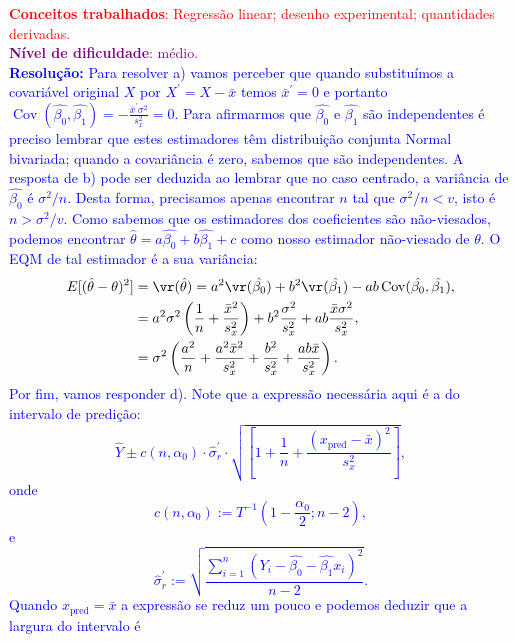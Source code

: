 \textcolor{red}{\textbf{Conceitos trabalhados}: Regressão linear; desenho experimental; quantidades derivadas.}\\ \textcolor{purple}{\textbf{Nível de dificuldade}: médio.}\\
\textcolor{blue}{
\textbf{Resolução:}
Para resolver a) vamos perceber que quando substituímos a covariável original $X$ por $X^\prime = X-\bar{x}$ temos $\bar{x}^\prime = 0$ e portanto $\operatorname{Cov}\left(\hat{\beta_0}, \hat{\beta_1} \right)  = -\frac{\bar{x}^\prime \sigma^2}{s_x^2} = 0$.
Para afirmarmos que $\hat{\beta_0}$ e $\hat{\beta_1}$ são independentes é  preciso lembrar que estes estimadores têm distribuição conjunta Normal bivariada; quando a covariância é zero, sabemos que são independentes.
A resposta de b) pode ser deduzida ao lembrar que no caso centrado, a variância de $\hat{\beta_0}$ é $\sigma^2/n$. 
Desta forma, precisamos apenas encontrar $n$ tal que $\sigma^2/n < v$, isto é $n > \sigma^2/v$.
Como sabemos que os estimadores dos coeficientes são não-viesados, podemos encontrar $\hat{\theta} = a\hat{\beta_0} + b\hat{\beta_1} +c$ como nosso estimador não-viesado de $\theta$.
O EQM de tal estimador é a sua variância:
\begin{align*}
 E[(\hat{\theta}-\theta)^2] &= \vr(\hat{\theta}) = a^2 \vr(\hat{\beta_0}) + b^2\vr(\hat{\beta_1}) -ab \operatorname{Cov}(\hat{\beta_0}, \hat{\beta_1}),\\
 &=  a^2 \sigma^2 \left( \frac{1}{n} + \frac{\bar{x}^2}{s_x^2} \right) + b^2\frac{\sigma^2}{s_x^2} + ab \frac{\bar{x}\sigma^2}{s_x^2},\\
 &= \sigma^2 \left(\frac{a^2}{n} + \frac{a^2\bar{x}^2}{s_x^2} + \frac{b^2}{s_x^2} + \frac{ab\bar{x}}{s_x^2}\right).
\end{align*}
Por fim, vamos responder d).
Note que a expressão necessária aqui é a do intervalo de predição:
\begin{equation*}
 \hat{Y} \pm  c(n, \alpha_0)\cdot\hat{\sigma}_r^\prime \cdot \sqrt{\left[ 1+ \frac{1}{n} + \frac{\left(x_{\text{pred}}-\bar{x}\right)^2}{s_x^2} \right]},
\end{equation*}
onde
\begin{equation*}
 c(n, \alpha_0) := T^{-1}\left(1-\frac{\alpha_0}{2}; n-2\right),
\end{equation*}
e
\begin{equation*}
 \hat{\sigma}_r^\prime := \sqrt{\frac{\sum_{i=1}^n \left(Y_i - \hat{\beta_0} - \hat{\beta_1}x_i \right)^2}{n-2}}.
\end{equation*}
Quando $x_{\text{pred}} = \bar{x}$ a expressão se reduz um pouco e podemos deduzir que a largura do intervalo é
}
